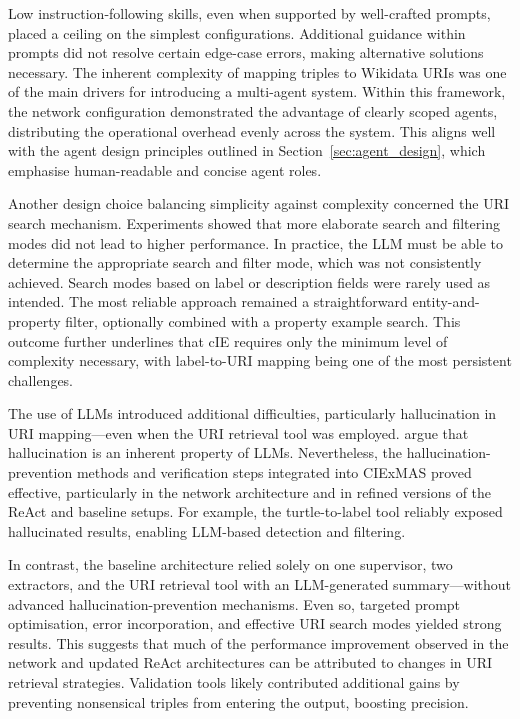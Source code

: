 \documentclass[a4paper,oneside,bibliography=totoc]{scrbook}
\begin{document}
Low instruction-following skills, even when supported by well-crafted prompts, placed a ceiling on the simplest configurations. Additional guidance within prompts did not resolve certain edge-case errors, making alternative solutions necessary. The inherent complexity of mapping triples to Wikidata URIs was one of the main drivers for introducing a multi-agent system. Within this framework, the network configuration demonstrated the advantage of clearly scoped agents, distributing the operational overhead evenly across the system. This aligns well with the agent design principles outlined in Section~\ref{sec:agent_design}, which emphasise human-readable and concise agent roles.

Another design choice balancing simplicity against complexity concerned the URI search mechanism. Experiments showed that more elaborate search and filtering modes did not lead to higher performance. In practice, the \ac{LLM} must be able to determine the appropriate search and filter mode, which was not consistently achieved. Search modes based on label or description fields were rarely used as intended. The most reliable approach remained a straightforward entity-and-property filter, optionally combined with a property example search. This outcome further underlines that \ac{cIE} requires only the minimum level of complexity necessary, with label-to-URI mapping being one of the most persistent challenges.

The use of \acp{LLM} introduced additional difficulties, particularly hallucination in URI mapping—even when the URI retrieval tool was employed. \citet{Xu2025} argue that hallucination is an inherent property of \acp{LLM}. Nevertheless, the hallucination-prevention methods and verification steps integrated into CIExMAS proved effective, particularly in the network architecture and in refined versions of the ReAct and baseline setups. For example, the turtle-to-label tool reliably exposed hallucinated results, enabling \ac{LLM}-based detection and filtering.

In contrast, the baseline architecture relied solely on one supervisor, two extractors, and the URI retrieval tool with an \ac{LLM}-generated summary—without advanced hallucination-prevention mechanisms. Even so, targeted prompt optimisation, error incorporation, and effective URI search modes yielded strong results. This suggests that much of the performance improvement observed in the network and updated ReAct architectures can be attributed to changes in URI retrieval strategies. Validation tools likely contributed additional gains by preventing nonsensical triples from entering the output, boosting precision.
\end{document}
